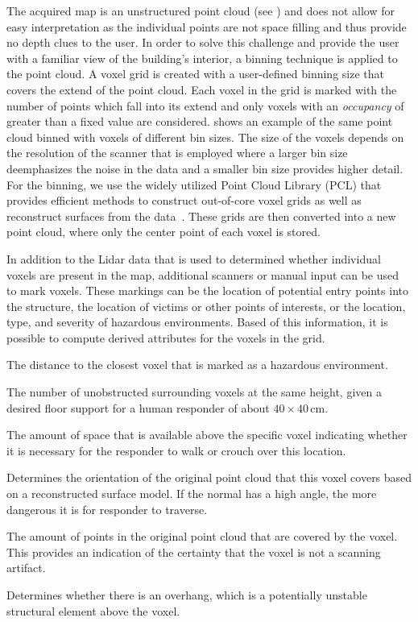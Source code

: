 The acquired map is an unstructured point cloud (see ) and does not allow for easy interpretation as the individual points are not space filling and thus provide no depth clues to the user.  In order to solve this challenge and provide the user with a familiar view of the building's interior, a binning technique is applied to the point cloud.  A voxel grid is created with a user-defined binning size that covers the extend of the point cloud.  Each voxel in the grid is marked with the number of points which fall into its extend and only voxels with an \emph{occupancy} of greater than a fixed value are considered.   shows an example of the same point cloud binned with voxels of different bin sizes.  The size of the voxels depends on the resolution of the scanner that is employed where a larger bin size deemphasizes the noise in the data and a smaller bin size provides higher detail.  For the binning, we use the widely utilized Point Cloud Library (PCL) that provides efficient methods to construct out-of-core voxel grids as well as reconstruct surfaces from the data~\cite{rusu20113d}.  These grids are then converted into a new point cloud, where only the center point of each voxel is stored.

In addition to the Lidar data that is used to determined whether individual voxels are present in the map, additional scanners or manual input can be used to mark voxels.  These markings can be the location of potential entry points into the structure, the location of victims or other points of interests, or the location, type, and severity of hazardous environments.  Based of this information, it is possible to compute derived attributes for the voxels in the grid.

\begin{description}[leftmargin=6em,style=nextline]
  \item[Hazard]    The distance to the closest voxel that is marked as a hazardous environment.
  \item[Support]   The number of unobstructed surrounding voxels at the same height, given a desired floor support for a human responder of about $40\times40\,$cm.
  \item[Size]      The amount of space that is available above the specific voxel indicating whether it is necessary for the responder to walk or crouch over this location.
  \item[Normal]    Determines the orientation of the original point cloud that this voxel covers based on a reconstructed surface model.  If the normal has a high angle, the more dangerous it is for responder to traverse.
  \item[Occupancy] The amount of points in the original point cloud that are covered by the voxel.  This provides an indication of the certainty that the voxel is not a scanning artifact.
  \item[Overhang]  Determines whether there is an overhang, which is a potentially unstable structural element above the voxel.
\end{description}

